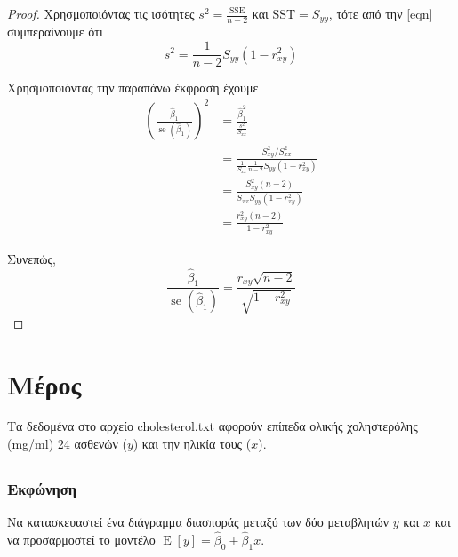 \documentclass{article}
\DeclareMathOperator{\E}{\mathrm{E}}
\DeclareMathOperator{\se}{\mathrm{se}}
\newcommand{\SSE}{\mathrm{SSE}}
\newcommand{\SST}{\mathrm{SST}}
\newcommand{\hb}{\hat{\beta}}
\begin{document}
\begin{proof}
    Χρησμοποιόντας τις ισότητες \(s^2 = \frac{\SSE}{n-2}\) και \(\SST = S_{yy}\), τότε από την \eqref{eqn} συμπεραίνουμε ότι
    \begin{equation*}
        s^2 = \frac{1}{n-2} S_{yy} \left( 1 - r_{xy}^2 \right)
    \end{equation*}

    Χρησμοποιόντας την παραπάνω έκφραση έχουμε
    \begin{equation*}
        \begin{split}
            \left( \frac{\hb_1}{\se(\hb_1)} \right)^2 &= \frac{\hb_1^2}{\frac{s^2}{S_{xx}}}\\
            &= \frac{S_{xy}^2 / S_{xx}^2}{\frac{1}{S_{xx}}  \frac{1}{n-2} S_{yy} \left( 1 - r_{xy}^2 \right)}\\
            &= \frac{S_{xy}^2 (n-2)}{S_{xx} S_{yy} \left( 1 - r_{xy}^{2} \right)}\\
            &= \frac{r_{xy}^2 (n-2)}{1 - r_{xy}^2}
        \end{split}
    \end{equation*}

    Συνεπώς,
    \begin{equation*}
        \frac{\hb_1}{\se(\hb_1)} = \frac{r_{xy} \sqrt{n-2}}{\sqrt{1 - r_{xy}^2}}
    \end{equation*}
\end{proof}


\section{Μέρος}
Τα δεδομένα στο αρχείο \textlatin{cholesterol.txt} αφορούν επίπεδα ολικής χοληστερόλης
\textlatin{(mg/ml)} 24 ασθενών (\(y\)) και την ηλικία τους (\(x\)).

\subsection{}
\subsubsection*{Εκφώνηση}
Να κατασκευαστεί ένα διάγραμμα διασποράς μεταξύ των δύο μεταβλητών \(y\) και
\(x\) και να προσαρμοστεί το μοντέλο \(\E[y] = \hb_0 + \hb_1 x\).
\end{document}

